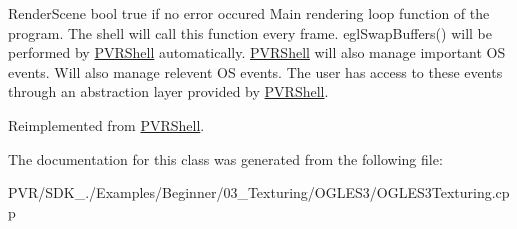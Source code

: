   Render\+Scene  bool true if no error occured  Main rendering loop function of the program. The shell will call this function every frame. egl\+Swap\+Buffers() will be performed by \hyperlink{class_p_v_r_shell}{P\+V\+R\+Shell} automatically. \hyperlink{class_p_v_r_shell}{P\+V\+R\+Shell} will also manage important O\+S events. Will also manage relevent O\+S events. The user has access to these events through an abstraction layer provided by \hyperlink{class_p_v_r_shell}{P\+V\+R\+Shell}. 

Reimplemented from \hyperlink{class_p_v_r_shell_ae0eb5f797cbe993a22b8659f9c332578}{P\+V\+R\+Shell}.



The documentation for this class was generated from the following file\+:\begin{DoxyCompactItemize}
\item 
P\+V\+R/\+S\+D\+K\+\_./\+Examples/\+Beginner/03\+\_\+\+Texturing/\+O\+G\+L\+E\+S3/O\+G\+L\+E\+S3\+Texturing.\+cpp\end{DoxyCompactItemize}
